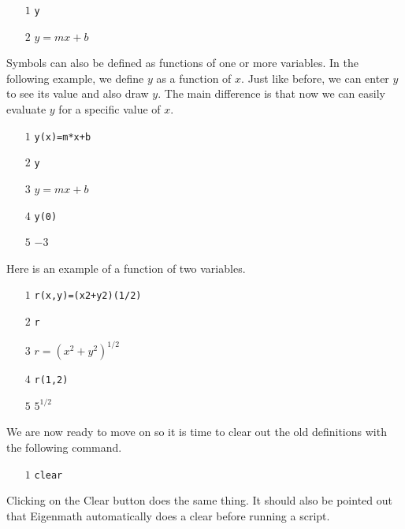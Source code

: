 \documentclass[12pt,openany]{report}
\begin{document}
\medskip
\noindent
\begin{itemize}
\item[$\scriptstyle1$]{\tt y}
\item[$\scriptstyle2$]\hspace{50pt} $y=mx+b$
\end{itemize}

\medskip
\noindent
Symbols can also be defined as functions of one or more variables.
In the following example, we define $y$ as a function of $x$.
Just like before, we can enter $y$ to see its value and
also draw $y$.
The main difference is that now we can easily evaluate $y$ for
a specific value of $x$.

\medskip
\noindent
\begin{itemize}
\item[$\scriptstyle1$]{\tt y(x)=m*x+b}
\item[$\scriptstyle2$]{\tt y}
\item[$\scriptstyle3$]\hspace{50pt} $y=mx+b$
\item[$\scriptstyle4$]{\tt y(0)}
\item[$\scriptstyle5$]\hspace{50pt} $-3$
\end{itemize}
\noindent

\medskip
\noindent
Here is an example of a function of two variables.
\begin{itemize}
\item[$\scriptstyle1$]{\tt r(x,y)=(x{}2+y{}2){}(1/2)}
\item[$\scriptstyle2$]{\tt r}
\item[$\scriptstyle3$]\hspace{50pt} $r=(x^2+y^2)^{1/2}$
\item[$\scriptstyle4$]{\tt r(1,2)}
\item[$\scriptstyle5$]\hspace{50pt} $5^{1/2}$
\end{itemize}

\medskip
\noindent
We are now ready to move on so
it is time to clear out the old definitions
with the following command.

\medskip
\noindent
\begin{itemize}
\item[$\scriptstyle1$]{\tt clear}
\end{itemize}

\medskip
\noindent
Clicking on the Clear button does the same thing.
It should also be pointed out that Eigenmath automatically does a clear before
running a script.
\end{document}
